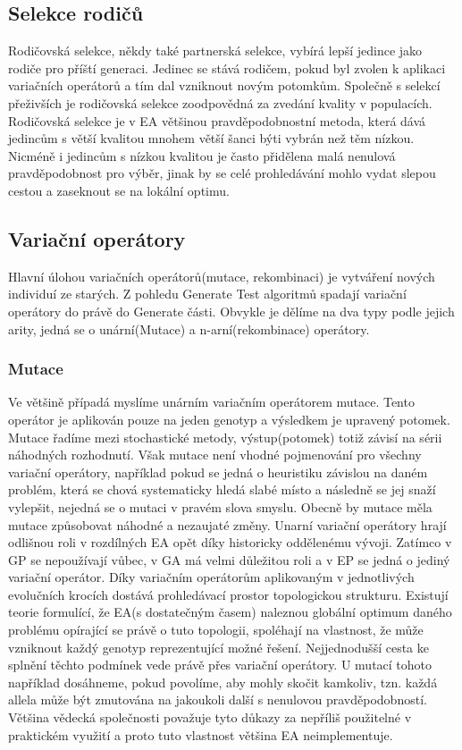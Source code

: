 \subsection{Selekce rodičů}
Rodičovská selekce, někdy také partnerská selekce, vybírá lepší jedince jako rodiče pro příští generaci. Jedinec se stává rodičem, pokud byl zvolen k aplikaci variačních operátorů a tím dal vzniknout novým potomkům. Společně s selekcí přeživších je rodičovská selekce zoodpovědná za zvedání kvality v populacích. Rodičovská selekce je v EA většinou pravděpodobnostní metoda, která dává jedincům s větší kvalitou mnohem větší šanci býti vybrán než těm nízkou. Nicméně i jedincům s nízkou kvalitou je často přidělena malá nenulová pravděpodobnost pro výběr, jinak by se celé prohledávání mohlo vydat slepou cestou a zaseknout se na lokální optimu. 
\subsection{Variační operátory}
Hlavní úlohou variačních operátorů(mutace, rekombinaci) je vytváření nových individuí ze starých. Z pohledu Generate  Test algoritmů spadají variační operátory do právě do Generate části. Obvykle je dělíme na dva typy podle jejich arity, jedná se o unární(Mutace) a n-arní(rekombinace) operátory.
\subsubsection{Mutace}
Ve většině případá myslíme unárním variačním operátorem mutace. Tento operátor je aplikován pouze na jeden genotyp a výsledkem je upravený potomek. Mutace řadíme mezi stochastické metody, výstup(potomek) totiž závisí na sérii náhodných rozhodnutí. Však mutace není vhodné pojmenování pro všechny variační operátory, například pokud se jedná o heuristiku závislou na daném problém, která se chová systematicky hledá slabé místo a následně se jej snaží vylepšit, nejedná se o mutaci v pravém slova smyslu. Obecně by mutace měla mutace způsobovat náhodné a nezaujaté změny. Unarní variační operátory hrají odlišnou roli v rozdílných EA opět díky historicky oddělenému vývoji. Zatímco v GP se nepoužívají vůbec, v GA má velmi důležitou roli a v EP se jedná o jediný variační operátor. Díky variačním operátorům aplikovaným v jednotlivých evolučních krocích dostává prohledávací prostor topologickou strukturu. Existují teorie formulící, že EA(s dostatečným časem) naleznou globální optimum daného problému opírající se právě o tuto topologii, spoléhají na vlastnost, že může vzniknout každý genotyp reprezentující možné řešení. Nejjednodušší cesta ke splnění těchto podmínek vede právě přes variační operátory. U mutací tohoto například dosáhneme, pokud povolíme, aby mohly skočit kamkoliv, tzn. každá allela může být zmutována na jakoukoli další s nenulovou pravděpodobností. Většina vědecká společnosti považuje tyto důkazy za nepříliš použitelné v praktickém využití a proto tuto vlastnost většina EA neimplementuje.  
